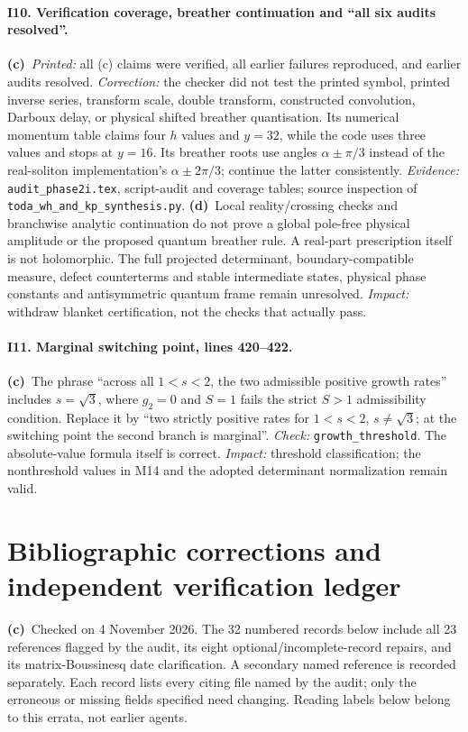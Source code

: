 \documentclass[11pt,a4paper]{article}
\newcommand{\C}{\textbf{(c)}\ }
\newcommand{\D}{\textbf{(d)}\ }
\newcommand{\file}[1]{\nolinkurl{#1}}
\newcommand{\test}[1]{\textit{Check:} \file{#1}.}
\begin{document}
\paragraph{I10. Verification coverage, breather continuation and ``all six audits resolved''.}
\C \textit{Printed:} all (c) claims were verified, all earlier failures
reproduced, and earlier audits resolved. \textit{Correction:} the checker
did not test the printed symbol, printed inverse series, transform scale,
double transform, constructed convolution, Darboux delay, or physical shifted
breather quantisation. Its numerical momentum table claims four $h$ values
and $y=32$, while the code uses three values and stops at $y=16$.
Its breather roots use angles $\alpha\pm\pi/3$ instead of the real-soliton
implementation's $\alpha\pm2\pi/3$; continue the latter consistently.
\textit{Evidence:} \file{audit_phase2i.tex}, script-audit and coverage tables;
source inspection of \file{toda_wh_and_kp_synthesis.py}.
\D Local reality/crossing checks and branchwise analytic continuation do
not prove a global pole-free physical amplitude or the proposed quantum
breather rule. A real-part prescription itself is not holomorphic.
The full projected determinant, boundary-compatible measure, defect
counterterms and stable intermediate states, physical phase constants and
antisymmetric quantum frame remain unresolved.
\textit{Impact:} withdraw blanket certification, not the checks that actually pass.

\paragraph{I11. Marginal switching point, lines 420--422.}
\C The phrase ``across all $1<s<2$, the two admissible positive growth rates''
includes $s=\sqrt3$, where $g_2=0$ and $S=1$ fails the strict $S>1$
admissibility condition. Replace it by ``two strictly positive rates for
$1<s<2$, $s\ne\sqrt3$; at the switching point the second branch is marginal''.
\test{growth_threshold} The absolute-value formula itself is correct.
\textit{Impact:} threshold classification; the nonthreshold values in M14
and the adopted determinant normalization remain valid.

\newpage
\section{Bibliographic corrections and independent verification ledger}
\C Checked on 4 November 2026. The 32 numbered records below include all
23 references flagged by the audit, its eight optional/incomplete-record
repairs, and its matrix-Boussinesq date clarification. A secondary named
reference is recorded separately. Each record lists every citing file named
by the audit; only the erroneous or missing fields specified need changing.
Reading labels below belong to this errata, not earlier agents.
\end{document}
